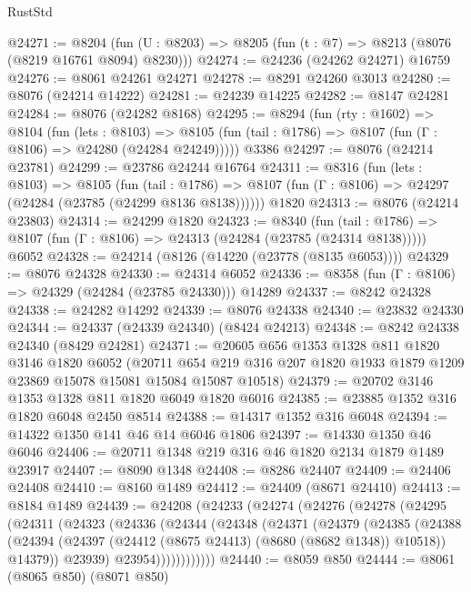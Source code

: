 \begin{lexlean}{RustStd}
\begin{coremodule}
@24271 := @8204
    (fun (U : @8203) => @8205 (fun (t : @7) => @8213 (@8076 (@8219 @16761 @8094) @8230)))
@24274 := @24236 (@24262 @24271) @16759
@24276 := @8061 @24261 @24271
@24278 := @8291 @24260 @3013
@24280 := @8076 (@24214 @14222)
@24281 := @24239 @14225
@24282 := @8147 @24281
@24284 := @8076 (@24282 @8168)
@24295 := @8294
    (fun (rty : @1602) =>
    @8104
      (fun (lets : @8103) =>
      @8105 (fun (tail : @1786) => @8107 (fun (Γ : @8106) => @24280 (@24284 @24249)))))
    @3386
@24297 := @8076 (@24214 @23781)
@24299 := @23786 @24244 @16764
@24311 := @8316
    (fun (lets : @8103) =>
    @8105
      (fun (tail : @1786) =>
      @8107 (fun (Γ : @8106) => @24297 (@24284 (@23785 (@24299 @8136 @8138))))))
    @1820
@24313 := @8076 (@24214 @23803)
@24314 := @24299 @1820
@24323 := @8340
    (fun (tail : @1786) => @8107 (fun (Γ : @8106) => @24313 (@24284 (@23785 (@24314 @8138)))))
    @6052
@24328 := @24214 (@8126 (@14220 (@23778 (@8135 @6053))))
@24329 := @8076 @24328
@24330 := @24314 @6052
@24336 := @8358 (fun (Γ : @8106) => @24329 (@24284 (@23785 @24330))) @14289
@24337 := @8242 @24328
@24338 := @24282 @14292
@24339 := @8076 @24338
@24340 := @23832 @24330
@24344 := @24337 (@24339 @24340) (@8424 @24213)
@24348 := @8242 @24338 @24340 (@8429 @24281)
@24371 := @20605
    @656
    @1353
    @1328
    @811
    @1820
    @3146
    @1820
    @6052
    (@20711 @654 @219 @316 @207 @1820 @1933 @1879 @1209 @23869 @15078 @15081 @15084 @15087 @10518)
@24379 := @20702 @3146 @1353 @1328 @811 @1820 @6049 @1820 @6016
@24385 := @23885 @1352 @316 @1820 @6048 @2450 @8514
@24388 := @14317 @1352 @316 @6048
@24394 := @14322 @1350 @141 @46 @14 @6046 @1806
@24397 := @14330 @1350 @46 @6046
@24406 := @20711 @1348 @219 @316 @46 @1820 @2134 @1879 @1489 @23917
@24407 := @8090 @1348
@24408 := @8286 @24407
@24409 := @24406 @24408
@24410 := @8160 @1489
@24412 := @24409 (@8671 @24410)
@24413 := @8184 @1489
@24439 := @24208
    (@24233
      (@24274
        (@24276
          (@24278
            (@24295
              (@24311
                (@24323
                  (@24336
                    (@24344
                      (@24348
                        (@24371
                          (@24379
                            (@24385
                              (@24388
                                (@24394
                                  (@24397 (@24412 (@8675 @24413) (@8680 (@8682 @1348)) @10518))
                                  @14379))
                              @23939)
                            @23954))))))))))))
@24440 := @8059 @850
@24444 := @8061 (@8065 @850) (@8071 @850)

\end{coremodule}
\end{lexlean}
